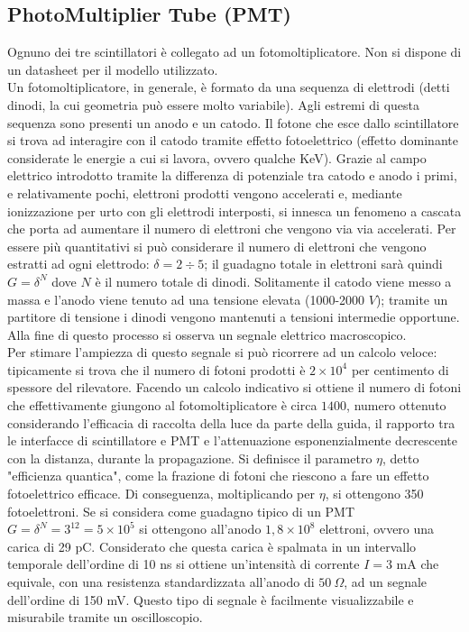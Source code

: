 \documentclass[a4paper,10pt]{article}
\begin{document}
\subsection{PhotoMultiplier Tube (PMT)}
Ognuno dei tre scintillatori è collegato ad un fotomoltiplicatore. Non si dispone di un datasheet per il modello utilizzato.\\
Un fotomoltiplicatore, in generale, è formato da una sequenza di elettrodi (detti dinodi, la cui geometria può essere molto variabile). Agli estremi di questa sequenza sono presenti un anodo e un catodo. Il fotone che esce dallo scintillatore si trova ad interagire con il catodo tramite effetto fotoelettrico (effetto dominante considerate le energie a cui si lavora, ovvero qualche KeV). Grazie al campo elettrico introdotto tramite la differenza di potenziale tra catodo e anodo i primi, e relativamente pochi, elettroni prodotti vengono accelerati e, mediante ionizzazione per urto con gli elettrodi interposti, si innesca un fenomeno a cascata che porta ad aumentare il numero di elettroni che vengono via via accelerati. Per essere più quantitativi si può considerare il numero di elettroni che vengono estratti ad ogni elettrodo: $\delta=2\div 5$; il guadagno totale in elettroni sarà quindi $G=\delta ^N$ dove $N$ è il numero totale di dinodi. Solitamente il catodo viene messo a massa e l'anodo viene tenuto ad una tensione elevata (1000-2000 $V$); tramite un partitore di tensione i dinodi vengono mantenuti a tensioni intermedie opportune. Alla fine di questo processo si osserva un segnale elettrico macroscopico.\\
Per stimare l'ampiezza di questo segnale si può ricorrere ad un calcolo veloce: tipicamente si trova che il numero di fotoni prodotti è $2\times 10^{4}$ per centimento di spessore del rilevatore. Facendo un calcolo indicativo si ottiene il numero di fotoni che effettivamente giungono al fotomoltiplicatore è circa $1400$, numero ottenuto considerando l'efficacia di raccolta della luce da parte della guida, il rapporto tra le interfacce di scintillatore e PMT e l'attenuazione esponenzialmente decrescente con la distanza, durante la propagazione. Si definisce il parametro $\eta$, detto "efficienza quantica", come la frazione di fotoni che riescono a fare un effetto fotoelettrico efficace. Di conseguenza, moltiplicando per $\eta$, si ottengono 350 fotoelettroni. Se si considera come guadagno tipico di un PMT $G=\delta ^N=3^{12}=5 \times 10^5$ si ottengono all'anodo $1,8 \times 10^8$ elettroni, ovvero una carica di 29 pC. Considerato che questa carica è spalmata in un intervallo temporale dell'ordine di 10 ns si ottiene un'intensità di corrente $I=3$ mA che equivale, con una resistenza standardizzata all'anodo di $50\ \Omega$, ad un segnale dell'ordine di 150 mV. Questo tipo di segnale è facilmente visualizzabile e misurabile tramite un oscilloscopio.
\end{document}
